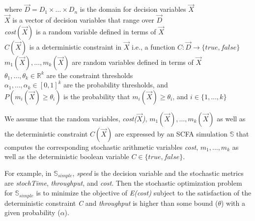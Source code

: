 \documentclass[a4paper, 12pt]{article} %
\begin{document}
where $\vec{D} = D_1 \times \dots \times D_n$ is the domain for decision variables $\vec{X}$\\
\indent\indent\indent$\vec{X}$ is a vector of decision variables that range over $\vec{D}$\\
\indent\indent\indent\textit{cost}$(\vec{X})$ is a random variable defined in terms of $\vec{X}$\\
\indent\indent\indent$C(\vec{X})$ is a deterministic constraint in $\vec{X}$ i.e., a function $C:\vec{D} \rightarrow \{true,false\}$\\
\indent\indent\indent $m_1(\vec{X}),\dots,m_k(\vec{X})$ are random variables defined in terms of $\vec{X}$\\
\indent\indent\indent$\theta_1,\dots,\theta_k \in \mathbb{R}^k$ are the constraint thresholds \\
\indent\indent\indent$\alpha_1,\dots,\alpha_k \in [0,1]^k$ are the probability thresholds, and\\
\indent\indent\indent$P(m_i(\vec{X}) \ge \theta_i)$ is the probability that $m_i(\vec{X}) \ge \theta_i$, and $i\in\{1,\dots,k\}$


We assume that the random variables, \textit{cost($\vec{X}$)}, $m_1(\vec{X}),\dots,m_k(\vec{X})$ as well as the deterministic constraint $C(\vec{X})$ are expressed by an SCFA simulation $\mathbb{S}$ that computes the corresponding stochastic arithmetic variables \textit{cost}, $m_1,\dots,m_k$ as well as the deterministic boolean variable $C \in \{true, false\}$. 

For example, in $\mathbb{S}_{simple}$, \textit{speed} is the decision variable and the stochastic metrics are \textit{stochTime}, \textit{throughput}, and \textit{cost}. Then the stochastic optimization problem for $\mathbb{S}_{simple}$ is to minimize the objective of  \textit{E(cost)} subject to the satisfaction of the deterministic constraint \textit{C} and \textit{throughput} is higher than some bound ($\theta$) with a given probability ($\alpha$).
\end{document}
